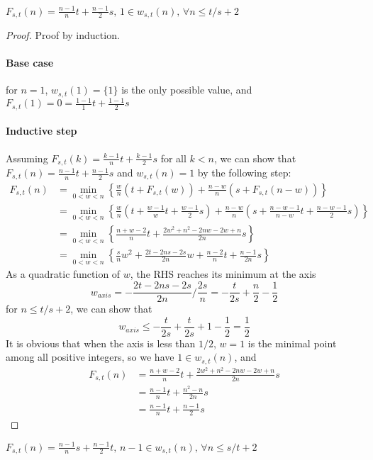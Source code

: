 \documentclass[]{article}
\begin{document}
\begin{lemma}
	$F_{s,t}(n) = \frac{n - 1}{n}t + \frac{n-1}{2}s,\, 1 \in w_{s,t}(n),\, \forall n \leq t/s + 2$
\end{lemma}
\begin{proof}
	Proof by induction. 
	\paragraph{Base case} for $n = 1$, $w_{s,t}(1) = \{1\}$ is the only possible value, and $F_{s,t}(1) = 0 = \frac{1 - 1}{1}t + \frac{1-1}{2}s$
	\paragraph{Inductive step} Assuming $F_{s,t}(k) = \frac{k - 1}{n}t + \frac{k-1}{2}s$ for all $k < n$, we can show that $F_{s,t}(n) = \frac{n - 1}{n}t + \frac{n-1}{2}s$ and $w_{s,t}(n) = 1$ by the following step:
	\begin{align*}
	F_{s,t}(n) &= \min_{0<w<n}\left\{\frac{w}{n}(t + F_{s,t}(w)) + \frac{n-w}{n}(s + F_{s,t}(n-w))\right\}\\
	&= \min_{0<w<n}\left\{\frac{w}{n}(t + \frac{w - 1}{w}t + \frac{w-1}{2}s) + \frac{n-w}{n}(s + \frac{n-w - 1}{n-w}t + \frac{n-w-1}{2}s)\right\}\\
	&=\min_{0<w<n}\left\{\frac{n+w-2}{n}t + \frac{2w^2+n^2-2nw-2w+n}{2n}s\right\}\\
	&=\min_{0<w<n}\left\{\frac{s}{n}w^2 + \frac{2t-2ns-2s}{2n}w + 
	\frac{n-2}{n}t + \frac{n-1}{2n}s\right\}
	\end{align*}
	As a quadratic function of $w$, the RHS reaches its minimum at the axis
	\[
		w_{axis} = -\frac{2t-2ns-2s}{2n}/\frac{2s}{n} = -\frac{t}{2s} + \frac{n}{2} - \frac{1}{2}
	\]
	for $n \leq t/s + 2$, we can show that
	\[
	w_{axis} \leq -\frac{t}{2s} + \frac{t}{2s} + 1  - \frac{1}{2} = \frac{1}{2}
	\]
	It is obvious that when the axis is less than $1/2$, $w = 1$ is the minimal point among all positive integers, so we have $1 \in w_{s,t}(n)$, and
	\begin{align*}
	F_{s,t}(n) &=\frac{n+w-2}{n}t + \frac{2w^2+n^2-2nw-2w+n}{2n}s\\
	&=\frac{n-1}{n}t + \frac{n^2-n}{2n}s\\
	&=\frac{n-1}{n}t + \frac{n-1}{2}s
	\end{align*}
\end{proof}

\begin{lemma}
	$F_{s,t}(n) = \frac{n - 1}{n}s + \frac{n-1}{2}t,\, n-1 \in w_{s,t}(n),\, \forall n \leq s/t + 2$
\end{lemma}
\end{document}
